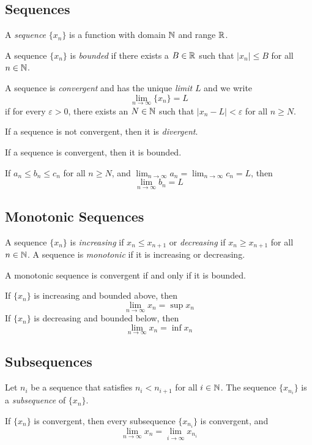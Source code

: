 \documentclass[12pt]{article}
\begin{document}
\subsection{Sequences}
\begin{definition}
    A \textit{sequence} \(\{x_n\}\) is a function with domain \(\mathbb{N}\) and range
    \(\mathbb{R}\).
\end{definition}
\begin{definition}
    A sequence \(\{x_n\}\) is \textit{bounded} if there exists a \(B\in\mathbb{R}\)
    such that \(|x_n|\leq B\) for all \(n\in\mathbb{N}\).
\end{definition}
\begin{definition}
    A sequence is \textit{convergent} and has the unique \textit{limit} \(L\)
    and we write
    \[\lim_{n\to\infty}\{x_n\}=L\]
    if for every \(\varepsilon>0\), there exists an \(N\in\mathbb{N}\) such that
    \(|x_n-L|<\varepsilon\) for all \(n\geq N\).
\end{definition}
If a sequence is not convergent, then it is \textit{divergent}.
\begin{theorem}
    If a sequence is convergent, then it is bounded.
\end{theorem}
\begin{theorem}
    If \(a_n\leq b_n\leq c_n\) for all \(n\geq N\), and
    \(\lim_{n\to\infty}a_n=\lim_{n\to\infty}c_n=L\), then
    \[\lim_{n\to\infty}b_n=L\]
\end{theorem}

\subsection{Monotonic Sequences}
\begin{definition}
    A sequence \(\{x_n\}\) is \textit{increasing} if \(x_n\leq x_{n+1}\) or
    \textit{decreasing} if \(x_n\geq x_{n+1}\) for all \(n\in\mathbb{N}\).
    A sequence is \textit{monotonic} if it is increasing or decreasing.
\end{definition}
\begin{theorem}
    A monotonic sequence is convergent if and only if it is bounded.
\end{theorem}
If \(\{x_n\}\) is increasing and bounded above, then
\[\lim_{n\to\infty}x_n=\sup x_n\]
If \(\{x_n\}\) is decreasing and bounded below, then
\[\lim_{n\to\infty}x_n=\inf x_n\]

\subsection{Subsequences}
\begin{definition}
    Let \(n_i\) be a sequence that satisfies \(n_i<n_{i+1}\) for all
    \(i\in\mathbb{N}\).
    The sequence \(\{x_{n_i}\}\) is a \textit{subsequence} of \(\{x_n\}\).
\end{definition}
\begin{theorem}
    If \(\{x_n\}\) is convergent, then every subsequence \(\{x_{n_i}\}\) is
    convergent, and
    \[\lim_{n\to\infty}x_n=\lim_{i\to\infty}x_{n_i}\]
\end{theorem}
\end{document}
